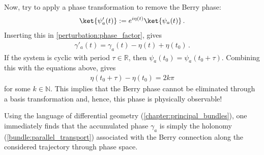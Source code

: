     Now, try to apply a phase transformation to remove the Berry phase:
    \begin{gather}
        \label{perturbation:phase_transform}
        \ket{\psi'_a(t)} := e^{i\eta(t)}\ket{\psi_a(t)}\,.
    \end{gather}
    Inserting this in \cref{perturbation:phase_factor}, gives
    \begin{gather}
        \gamma'_a(t) = \gamma_a(t) - \eta(t) + \eta(t_0)\,.
    \end{gather}
    If the system is cyclic with period $\tau\in\mathbb{R}$, then $\psi_a(t_0) = \psi_a(t_0+\tau)$. Combining this with the equations above, gives
    \begin{gather}
        \eta(t_0+\tau) - \eta(t_0) = 2k\pi
    \end{gather}
    for some $k\in\mathbb{N}$. This implies that the Berry phase cannot be eliminated through a basis transformation and, hence, this phase is physically observable!

    \begin{remark}
        Using the language of differential geometry (\cref{chapter:principal_bundles}), one immediately finds that the accumulated phase $\gamma_a$ is simply the holonomy (\cref{bundle:parallel_transport}) associated with the Berry connection along the considered trajectory through phase space.
    \end{remark}